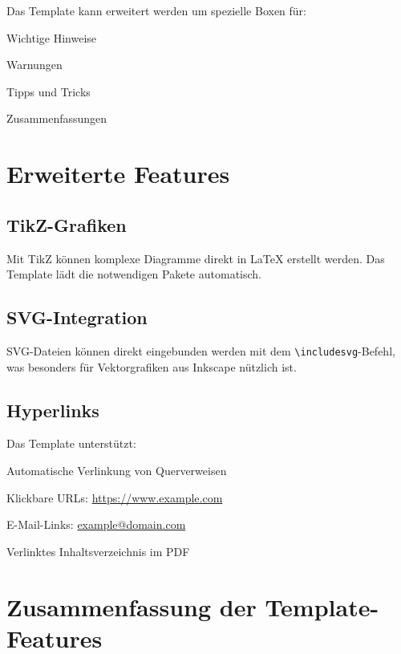 Das Template kann erweitert werden um spezielle Boxen für:
\begin{listenabsatz}
	\item Wichtige Hinweise
	\item Warnungen
	\item Tipps und Tricks
	\item Zusammenfassungen
\end{listenabsatz}

\section{Erweiterte Features}
\label{sec:erweiterte_features}

\subsection{TikZ-Grafiken}
\label{subsec:tikz}

Mit TikZ können komplexe Diagramme direkt in \LaTeX{} erstellt werden. Das Template lädt die notwendigen Pakete automatisch.

\subsection{SVG-Integration}
\label{subsec:svg}

SVG-Dateien können direkt eingebunden werden mit dem \texttt{\textbackslash includesvg}-Befehl, was besonders für Vektorgrafiken aus Inkscape nützlich ist.

\subsection{Hyperlinks}
\label{subsec:hyperlinks}

Das Template unterstützt:
\begin{listenabsatz}
	\item Automatische Verlinkung von Querverweisen
	\item Klickbare URLs: \url{https://www.example.com}
	\item E-Mail-Links: \href{mailto:example@domain.com}{example@domain.com}
	\item Verlinktes Inhaltsverzeichnis im PDF
\end{listenabsatz}

\section{Zusammenfassung der Template-Features}
\label{sec:template_zusammenfassung}

